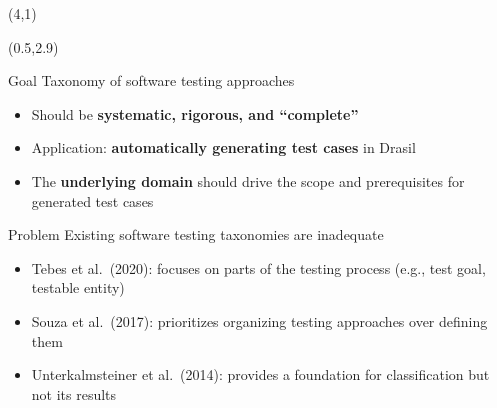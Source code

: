 \documentclass[22pt]{beamer}
\begin{document}
\begin{frame}[fragile]
    \begin{textblock}{8}(4,1)
        \titlepage
    \end{textblock}

    \begin{textblock}{7.25}(0.5,2.9)
        \begin{block}{\fontsize{37}{20}\selectfont Goal}
            Taxonomy of software testing approaches
            \begin{itemize}
                \item Should be \textbf{systematic, rigorous, and ``complete''}
                \item Application: \textbf{automatically generating test cases}
                      in Drasil \cite{Drasil}
                \item The \textbf{underlying domain} should drive the scope and
                      prerequisites for generated test cases
            \end{itemize}

            \vspace{5mm}
        \end{block}

        \begin{block}{\fontsize{37}{20}\selectfont Problem}
            Existing software testing taxonomies are inadequate
            \begin{itemize}
                \item Tebes et al.~(2020): focuses on parts of the
                      testing process (e.g., test goal, testable entity)
                \item Souza et al.~(2017): prioritizes organizing testing
                      approaches over defining them
                \item Unterkalmsteiner et al.~(2014): provides a foundation for
                      classification but not its results
            \end{itemize}
            \vspace{5mm}
        \end{block}


\end{textblock}
\end{frame}
\end{document}
